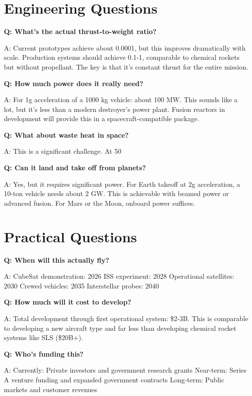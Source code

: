 \documentclass[12pt,letterpaper]{book}
\theoremstyle{definition}
\theoremstyle{plain}
\theoremstyle{remark}
\begin{document}
{{{{{\section{Engineering Questions}

\textbf{Q: What's the actual thrust-to-weight ratio?}

A: Current prototypes achieve about 0.0001, but this improves dramatically with scale. Production systems should achieve 0.1-1, comparable to chemical rockets but without propellant. The key is that it's constant thrust for the entire mission.

\textbf{Q: How much power does it really need?}

A: For 1g acceleration of a 1000 kg vehicle: about 100 MW. This sounds like a lot, but it's less than a modern destroyer's power plant. Fusion reactors in development will provide this in a spacecraft-compatible package.

\textbf{Q: What about waste heat in space?}

A: This is a significant challenge. At 50%

\textbf{Q: Can it land and take off from planets?}

A: Yes, but it requires significant power. For Earth takeoff at 2g acceleration, a 10-ton vehicle needs about 2 GW. This is achievable with beamed power or advanced fusion. For Mars or the Moon, onboard power suffices.

\section{Practical Questions}

\textbf{Q: When will this actually fly?}

A: CubeSat demonstration: 2026
ISS experiment: 2028  
Operational satellites: 2030
Crewed vehicles: 2035
Interstellar probes: 2040

\textbf{Q: How much will it cost to develop?}

A: Total development through first operational system: \$2-3B. This is comparable to developing a new aircraft type and far less than developing chemical rocket systems like SLS (\$20B+).

\textbf{Q: Who's funding this?}

A: Currently: Private investors and government research grants
Near-term: Series A venture funding and expanded government contracts
Long-term: Public markets and customer revenues

}}}}}
\end{document}
